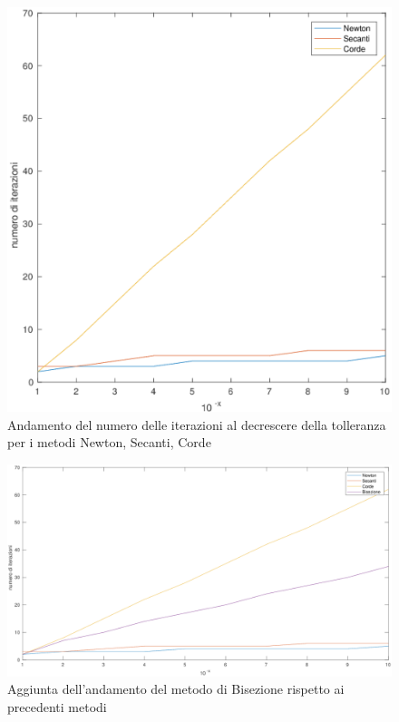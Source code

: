 \begin{figure}[h]
\label{fes26}
\includegraphics[left, scale=1]{plot/fes26}
\caption{Andamento del numero delle iterazioni al decrescere della tolleranza per i metodi Newton, Secanti, Corde}
\end{figure}
\begin{figure}[h]
\label{fes27}
\includegraphics[left, scale=0.6]{plot/fes27}
\caption{Aggiunta dell'andamento del metodo di Bisezione rispetto ai precedenti metodi}
\end{figure}


